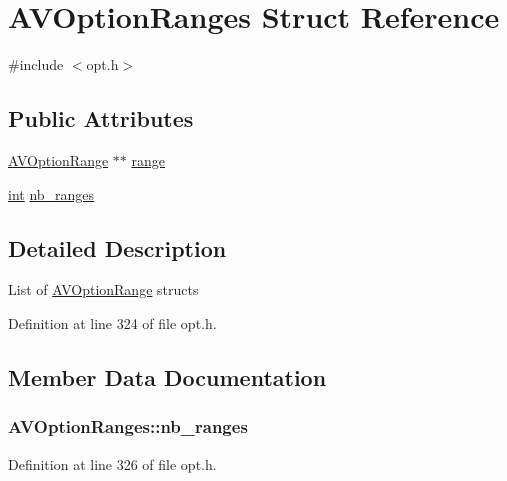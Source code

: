 \hypertarget{struct_a_v_option_ranges}{}\section{A\+V\+Option\+Ranges Struct Reference}
\label{struct_a_v_option_ranges}


{\ttfamily \#include $<$opt.\+h$>$}

\subsection*{Public Attributes}
\begin{DoxyCompactItemize}
\item 
\hyperlink{struct_a_v_option_range}{A\+V\+Option\+Range} $\ast$$\ast$ \hyperlink{struct_a_v_option_ranges_a6e081daa7e707607e63165909b0995ce}{range}
\item 
\hyperlink{xmltok_8h_a5a0d4a5641ce434f1d23533f2b2e6653}{int} \hyperlink{struct_a_v_option_ranges_a4cc8d5b5afbb07ae49357a7e0d6a2517}{nb\+\_\+ranges}
\end{DoxyCompactItemize}


\subsection{Detailed Description}
List of \hyperlink{struct_a_v_option_range}{A\+V\+Option\+Range} structs 

Definition at line 324 of file opt.\+h.



\subsection{Member Data Documentation}
\subsubsection[{\texorpdfstring{nb\+\_\+ranges}{nb_ranges}}]{ A\+V\+Option\+Ranges\+::nb\+\_\+ranges}\hypertarget{struct_a_v_option_ranges_a4cc8d5b5afbb07ae49357a7e0d6a2517}{}\label{struct_a_v_option_ranges_a4cc8d5b5afbb07ae49357a7e0d6a2517}


Definition at line 326 of file opt.\+h.

